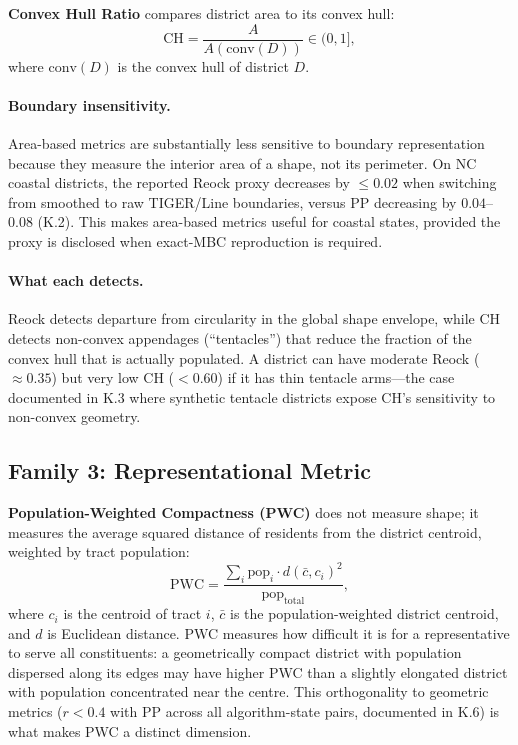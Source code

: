 \textbf{Convex Hull Ratio} compares district area to its convex hull:
\[
  \text{CH} = \frac{A}{A(\text{conv}(D))} \in (0, 1],
\]
where $\text{conv}(D)$ is the convex hull of district $D$.

\paragraph{Boundary insensitivity.}
Area-based metrics are substantially less sensitive to boundary representation
because they measure the interior area of a shape, not its perimeter.
On NC coastal districts, the reported Reock proxy decreases by $\leq 0.02$ when switching from
smoothed to raw TIGER/Line boundaries, versus PP decreasing by $0.04$--$0.08$
(K.2).
This makes area-based metrics useful for coastal states, provided the proxy is
disclosed when exact-MBC reproduction is required.

\paragraph{What each detects.}
Reock detects departure from circularity in the global shape envelope,
while CH detects non-convex appendages (``tentacles'') that reduce the fraction
of the convex hull that is actually populated. A district can have moderate Reock
($\approx 0.35$) but very low CH ($< 0.60$) if it has thin tentacle arms---the
case documented in K.3 where synthetic tentacle districts expose CH's sensitivity
to non-convex geometry.

\subsection{Family 3: Representational Metric}

\textbf{Population-Weighted Compactness (PWC)} does not measure shape;
it measures the average squared distance of residents from the district centroid,
weighted by tract population:
\[
  \text{PWC} = \frac{\sum_i \text{pop}_i \cdot d(\bar{c}, c_i)^2}{\text{pop}_{\text{total}}},
\]
where $c_i$ is the centroid of tract $i$, $\bar{c}$ is the population-weighted
district centroid, and $d$ is Euclidean distance.
PWC measures how difficult it is for a representative to serve all constituents:
a geometrically compact district with population dispersed along its edges
may have higher PWC than a slightly elongated district with population
concentrated near the centre.
This orthogonality to geometric metrics ($r < 0.4$ with PP across all algorithm-state
pairs, documented in K.6) is what makes PWC a distinct dimension.

